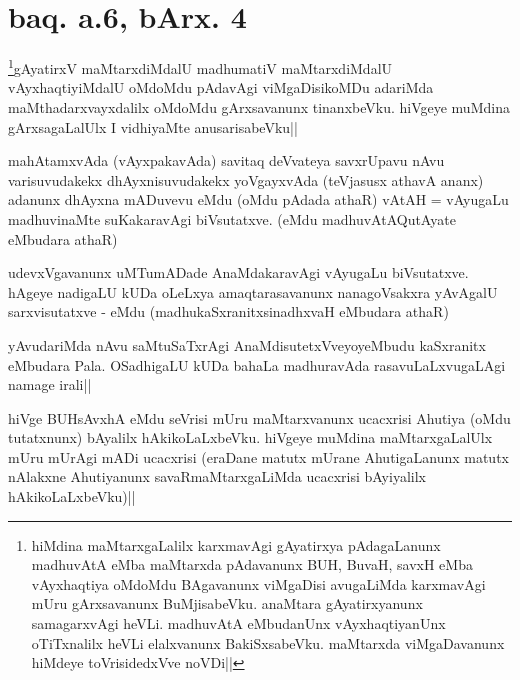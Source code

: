 
\section*{baq. a.6, bArx. 4}

\begin{artha}
\footnote[1]{hiMdina maMtarxgaLalilx karxmavAgi gAyatirxya 
pAdagaLanunx madhuvAtA eMba maMtarxda pAdavanunx BUH, BuvaH, savxH 
eMba vAyxhaqtiya oMdoMdu BAgavanunx viMgaDisi avugaLiMda karxmavAgi 
mUru gArxsavanunx BuMjisabeVku. anaMtara gAyatirxyanunx samagarxvAgi 
heVLi. madhuvAtA eMbudanUnx vAyxhaqtiyanUnx oTiTxnalilx heVLi 
elalxvanunx BakiSxsabeVku. maMtarxda viMgaDavanunx hiMdeye 
toVrisidedxVve noVDi||}gAyatirxV maMtarxdiMdalU madhumatiV maMtarxdiMdalU 
vAyxhaqtiyiMdalU oMdoMdu pAdavAgi viMgaDisikoMDu adariMda 
maMthadarxvayxdalilx oMdoMdu gArxsavanunx tinanxbeVku. hiVgeye muMdina 
gArxsagaLalUlx I vidhiyaMte anusarisabeVku||
\end{artha}


\begin{artha}
mahAtamxvAda (vAyxpakavAda) savitaq deVvateya savxrUpavu nAvu 
varisuvudakekx dhAyxnisuvudakekx yoVgayxvAda (teVjasusx athavA ananx) 
adanunx dhAyxna mADuvevu eMdu (oMdu pAdada athaR) vAtAH = vAyugaLu 
madhuvinaMte suKakaravAgi biVsutatxve. (eMdu madhuvAtAQutAyate 
eMbudara athaR)
\end{artha}


\begin{artha}
udevxVgavanunx uMTumADade AnaMdakaravAgi vAyugaLu biVsutatxve. hAgeye 
nadigaLU kUDa oLeLxya amaqtarasavanunx nanagoVsakxra yAvAgalU 
sarxvisutatxve - eMdu (madhukaSxranitxsinadhxvaH eMbudara athaR)
\end{artha}


\begin{artha}
yAvudariMda nAvu saMtuSaTxrAgi AnaMdisutetxVveyoyeMbudu kaSxranitx 
eMbudara Pala. OSadhigaLU kUDa bahaLa madhuravAda rasavuLaLxvugaLAgi 
namage irali||
\end{artha}

\begin{artha}
hiVge BUHsAvxhA eMdu seVrisi mUru maMtarxvanunx ucacxrisi Ahutiya 
(oMdu tutatxnunx) bAyalilx hAkikoLaLxbeVku. hiVgeye muMdina 
maMtarxgaLalUlx mUru mUrAgi mADi ucacxrisi (eraDane matutx mUrane 
AhutigaLanunx matutx nAlakxne Ahutiyanunx savaRmaMtarxgaLiMda 
ucacxrisi bAyiyalilx hAkikoLaLxbeVku)||
\end{artha}

